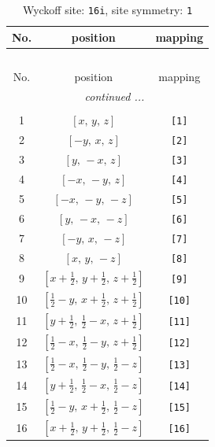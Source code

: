 \documentclass[fleqn,8pt]{jsarticle}
\begin{document}
\begin{longtable}{ccc}
\caption{Wyckoff site: {\tt 16i}, site symmetry: {\tt 1}}
 \\
 \hline \hline
No. & position & mapping \\ \hline \endfirsthead

\multicolumn{2}{l}{\tablename\ \thetable{}} \\
 \hline \hline
No. & position & mapping \\ \hline \endhead

 \hline \hline
\multicolumn{2}{r}{\footnotesize\it continued ...} \\ \endfoot

 \hline \hline
\multicolumn{2}{r}{} \\ \endlastfoot

1 & $\left[ x,\, y,\, z \right]$ & {\tt [1]} \\ \hline
2 & $\left[ - y,\, x,\, z \right]$ & {\tt [2]} \\ \hline
3 & $\left[ y,\, - x,\, z \right]$ & {\tt [3]} \\ \hline
4 & $\left[ - x,\, - y,\, z \right]$ & {\tt [4]} \\ \hline
5 & $\left[ - x,\, - y,\, - z \right]$ & {\tt [5]} \\ \hline
6 & $\left[ y,\, - x,\, - z \right]$ & {\tt [6]} \\ \hline
7 & $\left[ - y,\, x,\, - z \right]$ & {\tt [7]} \\ \hline
8 & $\left[ x,\, y,\, - z \right]$ & {\tt [8]} \\ \hline
9 & $\left[ x + \frac{1}{2},\, y + \frac{1}{2},\, z + \frac{1}{2} \right]$ & {\tt [9]} \\ \hline
10 & $\left[ \frac{1}{2} - y,\, x + \frac{1}{2},\, z + \frac{1}{2} \right]$ & {\tt [10]} \\ \hline
11 & $\left[ y + \frac{1}{2},\, \frac{1}{2} - x,\, z + \frac{1}{2} \right]$ & {\tt [11]} \\ \hline
12 & $\left[ \frac{1}{2} - x,\, \frac{1}{2} - y,\, z + \frac{1}{2} \right]$ & {\tt [12]} \\ \hline
13 & $\left[ \frac{1}{2} - x,\, \frac{1}{2} - y,\, \frac{1}{2} - z \right]$ & {\tt [13]} \\ \hline
14 & $\left[ y + \frac{1}{2},\, \frac{1}{2} - x,\, \frac{1}{2} - z \right]$ & {\tt [14]} \\ \hline
15 & $\left[ \frac{1}{2} - y,\, x + \frac{1}{2},\, \frac{1}{2} - z \right]$ & {\tt [15]} \\ \hline
16 & $\left[ x + \frac{1}{2},\, y + \frac{1}{2},\, \frac{1}{2} - z \right]$ & {\tt [16]} \\
\end{longtable}
\end{document}
